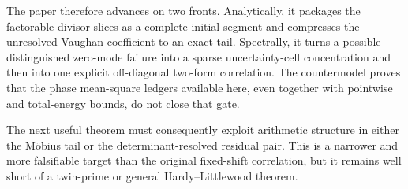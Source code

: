 The paper therefore advances on two fronts.  Analytically, it packages
the factorable divisor slices as a complete initial segment and
compresses the unresolved Vaughan coefficient to an exact tail.
Spectrally, it turns a possible distinguished zero-mode failure into a
sparse uncertainty-cell concentration and then into one explicit
off-diagonal two-form correlation.  The countermodel proves that the
phase mean-square ledgers available here, even together with pointwise
and total-energy bounds, do not close that gate.

The next useful theorem must consequently exploit arithmetic structure
in either the Möbius tail or the determinant-resolved residual pair.
This is a narrower and more falsifiable target than the original
fixed-shift correlation, but it remains well short of a twin-prime or
general Hardy--Littlewood theorem.

